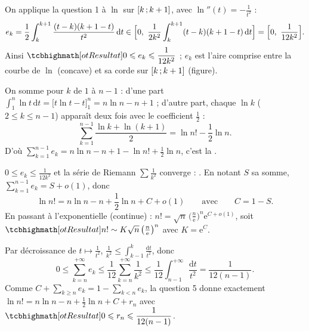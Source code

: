 \begin{corrigeEval}[Un développement de $\ln n!$]{}{}
\begin{questions}[start=4]
  \item On applique la question 1 à $\ln$ sur $\mathopen{[}k\,{;}\,k+1\mathclose{]}$, avec
    $\ln''(t)=-\frac{1}{t^{2}}$ :
    \[e_k=\frac12\int_k^{k+1}\frac{(t-k)(k+1-t)}{t^{2}}\,\mathrm{d}t\in
      \Bigl[0,\ \frac{1}{2k^{2}}\int_k^{k+1}(t-k)(k+1-t)\,\mathrm{d}t\Bigr]
      =\Bigl[0,\ \frac{1}{12k^{2}}\Bigr].\]
    Ainsi $\res{0\leqslant e_k\leqslant\dfrac{1}{12k^{2}}}$ ; $e_k$ est l'aire
    comprise entre la courbe de $\ln$ (concave) et sa corde sur
    $\mathopen{[}k\,{;}\,k+1\mathclose{]}$ (figure).
  \item On somme pour $k$ de $1$ à $n-1$ : d'une part
    $\int_1^{n}\ln t\,\mathrm{d}t=\bigl[t\ln t-t\bigr]_1^{n}=n\ln n-n+1$ ;
    d'autre part, chaque $\ln k$ ($2\leqslant k\leqslant n-1$) apparaît deux
    fois avec le coefficient $\frac12$ :
    \[\sum_{k=1}^{n-1}\frac{\ln k+\ln(k+1)}{2}=\ln n!-\frac12\ln n.\]
    D'où $\sum_{k=1}^{n-1}e_k=n\ln n-n+1-\ln n!+\frac12\ln n$, c'est la
    .
  \item $0\leqslant e_k\leqslant\frac{1}{12k^{2}}$ et la série de Riemann
    $\sum\frac{1}{k^{2}}$ converge : . En notant
    $S$ sa somme, $\sum_{k=1}^{n-1}e_k=S+o(1)$, donc
    \[\ln n!=n\ln n-n+\frac12\ln n+C+o(1)\qquad\text{avec}\qquad C=1-S.\]
    En passant à l'exponentielle (continue) :
    $n!=\sqrt n\,\bigl(\frac n{\mathrm{e}}\bigr)^{n}\mathrm{e}^{C+o(1)}$, soit
    $\res{n!\sim K\sqrt n\,\bigl(\tfrac n{\mathrm{e}}\bigr)^{n}}$ avec
    $K=\mathrm{e}^{C}$.
  \item Par décroissance de $t\mapsto\frac1{t^{2}}$,
    $\frac{1}{k^{2}}\leqslant\int_{k-1}^{k}\frac{\mathrm{d}t}{t^{2}}$, donc
    \[0\leqslant\sum_{k=n}^{+\infty}e_k\leqslant\frac{1}{12}\sum_{k=n}^{+\infty}\frac{1}{k^{2}}
      \leqslant\frac1{12}\int_{n-1}^{+\infty}\frac{\mathrm{d}t}{t^{2}}=\frac{1}{12(n-1)}.\]
    Comme $C+\sum_{k\geqslant n}e_k=1-\sum_{k<n}e_k$, la question 5 donne
    exactement
    $\ln n!=n\ln n-n+\frac12\ln n+C+r_n$ avec
    $\res{0\leqslant r_n\leqslant\dfrac{1}{12(n-1)}}$.
\end{questions}
\begin{center}\begin{minipage}{\linewidth}\centering
{}
\end{minipage}
\end{center}
\end{corrigeEval}
